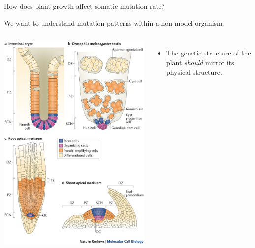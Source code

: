 \documentclass[table]{beamer}
\begin{document}
\begin{frame}{How does plant growth affect somatic mutation rate?}

We want to understand mutation patterns within a non-model organism.

\begin{columns}
		\includegraphics[trim={12cm 2cm 0 22cm},clip,width=.8\linewidth]{stemcells.jpg}
		\begin{itemize}
			\item The genetic structure of the plant \textit{should} mirror its physical structure.
		\end{itemize}
\end{columns}
\end{frame}
\end{document}
